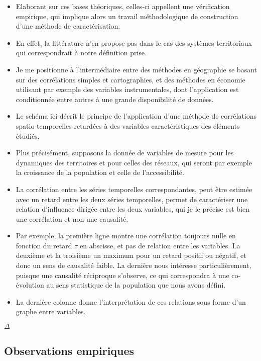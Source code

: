 \documentclass[12pt]{article}
\begin{document}
\begin{itemize}
	\item Elaborant sur ces bases théoriques, celles-ci appellent une vérification empirique, qui implique alors un travail méthodologique de construction d'une méthode de caractérisation.
	\item En effet, la littérature n'en propose pas dans le cas des systèmes territoriaux qui correspondrait à notre définition prise.
	\item Je me positionne à l'intermédiaire entre des méthodes en géographie se basant sur des corrélations simples et cartographies, et des méthodes en économie utilisant par exemple des variables instrumentales, dont l'application est conditionnée entre autres à une grande disponibilité de données.
	\item Le schéma ici décrit le principe de l'application d'une méthode de corrélations spatio-temporelles retardées à des variables caractéristiques des éléments étudiés.
	\item Plus précisément, supposons la donnée de variables de mesure pour les dynamiques des territoires et pour celles des réseaux, qui seront par exemple la croissance de la population et celle de l'accessibilité.
	\item La corrélation entre les séries temporelles correspondantes, peut être estimée avec un retard entre les deux séries temporelles, permet de caractériser une relation d'influence dirigée entre les deux variables, qui je le précise est bien une corrélation et non une causalité.
	\item Par exemple, la première ligne montre une corrélation toujours nulle en fonction du retard $\tau$ en abscisse, et pas de relation entre les variables. La deuxième et la troisième un maximum pour un retard positif ou négatif, et donc un sens de causalité faible. La dernière nous intéresse particulièrement, puisque une causalité réciproque s'observe, ce qui correspondra à une co-évolution au sens statistique de la population que nous avons défini.
	\item La dernière colonne donne l'interprétation de ces relations sous forme d'un graphe entre variables.
\end{itemize}


$\Delta$

\newpage

\subsection*{Observations empiriques}
\end{document}
